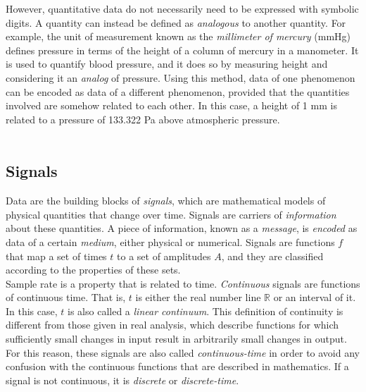However, quantitative data do not necessarily need to be expressed with symbolic digits. A quantity can instead be defined as \textit{analogous} to another quantity. For example, the unit of measurement known as the \textit{millimeter of mercury} (mmHg) defines pressure in terms of the height of a column of mercury in a manometer. It is used to quantify blood pressure, and it does so by measuring height and considering it an \textit{analog} of pressure. Using this method, data of one phenomenon can be encoded as data of a different phenomenon, provided that the quantities involved are somehow related to each other. In this case, a height of 1 mm is related to a pressure of 133.322 Pa above atmospheric pressure. \\\\

\subsection{Signals}


Data are the building blocks of \textit{signals}, which are mathematical models of physical quantities that change over time. Signals are carriers of \textit{information} about these quantities. A piece of information, known as a \textit{message}, is \textit{encoded} as data of a certain \textit{medium}, either physical or numerical. Signals are functions $f$ that map a set of times $t$ to a set of amplitudes $A$, and they are classified according to the properties of these sets. \\



Sample rate is a property that is related to time. \textit{Continuous} signals are functions of continuous time. That is, $t$ is either the real number line $\mathbb{R}$ or an interval of it. In this case, $t$ is also called a \textit{linear continuum}. This definition of continuity is different from those given in real analysis, which describe functions for which sufficiently small changes in input result in arbitrarily small changes in output. For this reason, these signals are also called \textit{continuous-time} in order to avoid any confusion with the continuous functions that are described in mathematics. If a signal is not continuous, it is \textit{discrete} or \textit{discrete-time}. \\

